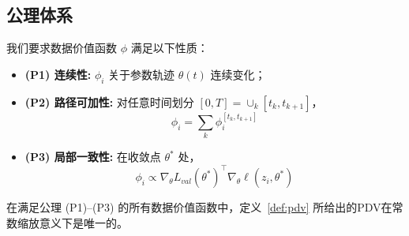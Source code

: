\subsection{公理体系}

我们要求数据价值函数 $\phi$ 满足以下性质：

\begin{itemize}
    \item \textbf{(P1) 连续性:} $\phi_i$ 关于参数轨迹 $\theta(t)$ 连续变化；
    
    \item \textbf{(P2) 路径可加性:} 对任意时间划分 $[0,T] = \cup_k [t_k, t_{k+1}]$，
    \[
    \phi_i = \sum_k \phi_i^{[t_k, t_{k+1}]}
    \]
    
    \item \textbf{(P3) 局部一致性:} 在收敛点 $\theta^*$ 处，
    \[
    \phi_i \propto 
    \nabla_\theta L_{val}(\theta^*)^\top 
    \nabla_\theta \ell(z_i, \theta^*)
    \]
\end{itemize}

\begin{theorem}
\label{thm:pdv_unique}
在满足公理 (P1)--(P3) 的所有数据价值函数中，定义~\ref{def:pdv} 所给出的PDV在常数缩放意义下是唯一的。
\end{theorem}


